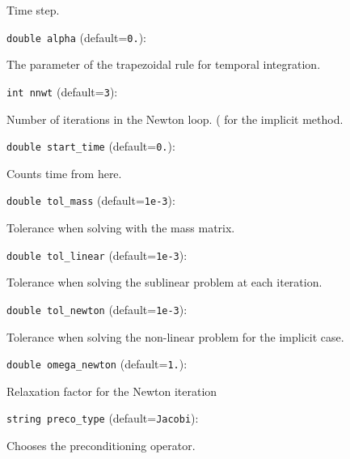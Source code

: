 Time step. 

\item\verb+double alpha+ {\rm(default=\verb|0.|)}:

The parameter of the trapezoidal rule
for temporal integration. 

\item\verb+int nnwt+ {\rm(default=\verb|3|)}:

Number of iterations in the Newton loop. (
for the implicit method. 

\item\verb+double start_time+ {\rm(default=\verb|0.|)}:

Counts time from here.

\item\verb+double tol_mass+ {\rm(default=\verb|1e-3|)}:

Tolerance when solving with the mass matrix. 

\item\verb+double tol_linear+ {\rm(default=\verb|1e-3|)}:

Tolerance when solving the sublinear problem
at each iteration.

\item\verb+double tol_newton+ {\rm(default=\verb|1e-3|)}:

Tolerance when solving the non-linear problem
for the implicit case.

\item\verb+double omega_newton+ {\rm(default=\verb|1.|)}:

Relaxation factor for the Newton iteration

\item\verb+string preco_type+ {\rm(default=\verb|Jacobi|)}:

Chooses the preconditioning operator. 

